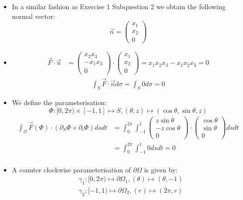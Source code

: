 \documentclass[11pt]{article}
\begin{document}
\begin{solution}     
    \begin{itemize}
    \item
    In a similar fashion as Exercise 1 Subquestion 2 we obtain the following normal vector:
		$$\vec{n} = \begin{pmatrix} x_1\\x_2\\0 \end{pmatrix}$$
    \item 
	\begin{align*}
	\vec F \cdot \vec n & = \begin{pmatrix}x_2x_3 \\ -x_1x_3\\0\end{pmatrix}\cdot \begin{pmatrix}x_1 \\ x_2\\0\end{pmatrix} = x_1x_2x_3 - x_1x_2x_3 = 0
	\end{align*}
	\begin{align*}
        \int_S \vec F \cdot \vec{n}d\sigma = \int_S 0 d\sigma = 0
     \end{align*}
    \item
    We define the parameterisation: 
	$$
	\Phi: [0,2\pi) \times [-1,1] \mapsto S, (\theta ,z) \mapsto (\cos\theta, \sin\theta ,z)
	$$
	\begin{align*}
        \int_\Omega \vec F(\Phi) \cdot ( \partial_S \Phi \times \partial_t \Phi ) dsdt &=\int_0^{2\pi} \int_{-1}^1 \begin{pmatrix}z\sin\theta\\ -z\cos\theta \\ 0\end{pmatrix} \cdot \begin{pmatrix}\cos\theta\\ \sin\theta \\ 0\end{pmatrix} dsdt \\
	    & = \int_0^{2\pi} \int_{-1}^1 0  dsdt  = 0\\
     \end{align*}
    \item 
    A counter clockwise parameterisation of $\partial \Omega$ is given by:
	\begin{align*}
	&\gamma_1: [0,2\pi) \mapsto \partial \Omega_1, (\theta) \mapsto (\theta, -1)\\
	&\gamma_2: [-1,1) \mapsto \partial \Omega_2, (r) \mapsto (2\pi, r)\\

\end{align*}
\end{itemize}
\end{solution}
\end{document}
